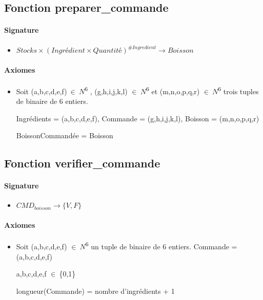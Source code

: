\documentclass[]{article}
\begin{document}
\subsection*{Fonction preparer\_commande}
\paragraph{Signature}
\begin{itemize}
\item
  $Stocks \times (Ingrédient \times Quantité)^{\#Ingredient} \longrightarrow  Boisson$
\end{itemize}
\paragraph{Axiomes}
\begin{itemize}
\item
  Soit (a,b,c,d,e,f)\(\  \in \ N\)\textsuperscript{6} ,
  (g,h,i,j,k,l) \(\in \ N\)\textsuperscript{6} et (m,n,o,p,q,r)
  \(\in \ N\)\textsuperscript{6} trois tuples de binaire de 6 entiers.

Ingrédients = (a,b,c,d,e,f), Commande = (g,h,i,j,k,l), Boisson =
(m,n,o,p,q,r)

BoissonCommandée = Boisson
\end{itemize}
\pagebreak

\subsection*{Fonction verifier\_commande}
\paragraph{Signature}
\begin{itemize}
\item
  $CMD_{boisson} \longrightarrow  \{V, F\}$
\end{itemize}
\paragraph{Axiomes}
\begin{itemize}
\item
  Soit (a,b,c,d,e,f) \(\in \ N\)\textsuperscript{6} un tuple de
  binaire de 6 entiers.
Commande = (a,b,c,d,e,f)

a,b,c,d,e,f \(\in \ \)\{0,1\}

longueur(Commande) = nombre d'ingrédients + 1
\end{itemize}
\end{document}

